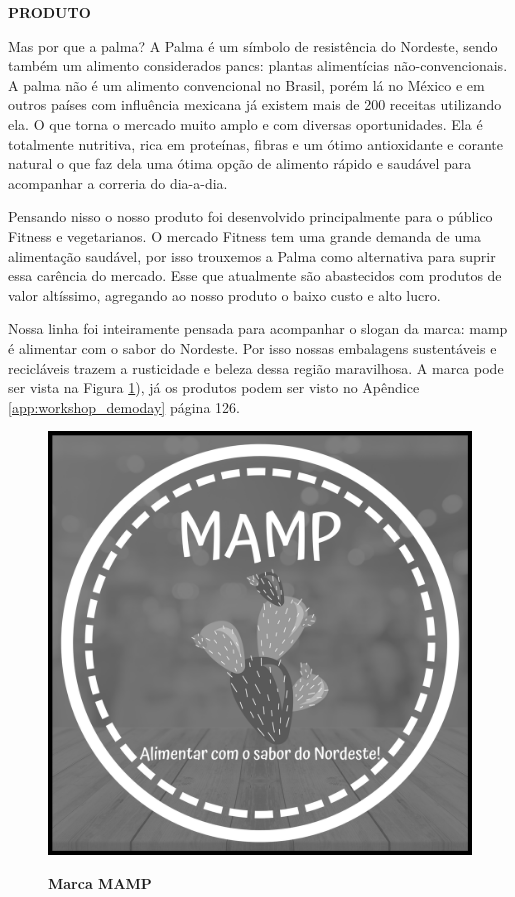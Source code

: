 \textbf{PRODUTO}

Mas por que a palma? A Palma é um símbolo de resistência do Nordeste, sendo também um alimento considerados pancs: plantas alimentícias não-convencionais. A palma não é um alimento convencional no Brasil, porém lá no México e em outros países com influência mexicana já existem mais de 200 receitas utilizando ela. O que torna o mercado muito amplo e com diversas oportunidades. Ela é totalmente nutritiva, rica em proteínas, fibras e um ótimo antioxidante e corante natural o que faz dela uma ótima opção de alimento rápido e saudável para acompanhar a correria do dia-a-dia.

Pensando nisso o nosso produto foi desenvolvido principalmente para o público Fitness e vegetarianos. O mercado Fitness tem uma grande demanda de uma alimentação saudável, por isso trouxemos a Palma como alternativa para suprir essa carência do mercado. Esse que atualmente são abastecidos com produtos de valor altíssimo, agregando ao nosso produto o baixo custo e alto lucro.

Nossa linha foi inteiramente pensada para acompanhar o slogan da marca: mamp é alimentar com o sabor do Nordeste. Por isso nossas embalagens sustentáveis e recicláveis trazem a rusticidade e beleza dessa região maravilhosa. A marca pode ser vista na Figura \ref{figura_22}), já os produtos podem ser visto no Apêndice \ref{app:workshop_demoday} página 126.


\begin{figure}[H]
\centering
\caption{\textbf{Marca MAMP}}
\includegraphics[scale=0.08]{Imagens/mamp.png}
\label{figura_22}
\end{figure}



